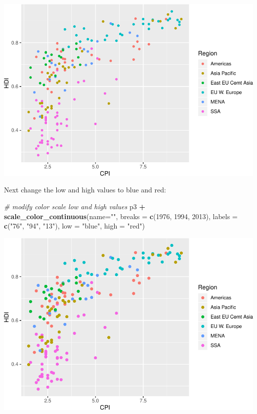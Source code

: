 \documentclass[
]{book}
\newenvironment{Shaded}{\begin{snugshade}}{\end{snugshade}}
\newcommand{\CommentTok}[1]{\textcolor[rgb]{0.56,0.35,0.01}{\textit{#1}}}
\newcommand{\DataTypeTok}[1]{\textcolor[rgb]{0.13,0.29,0.53}{#1}}
\newcommand{\DecValTok}[1]{\textcolor[rgb]{0.00,0.00,0.81}{#1}}
\newcommand{\KeywordTok}[1]{\textcolor[rgb]{0.13,0.29,0.53}{\textbf{#1}}}
\newcommand{\NormalTok}[1]{#1}
\newcommand{\OperatorTok}[1]{\textcolor[rgb]{0.81,0.36,0.00}{\textbf{#1}}}
\newcommand{\StringTok}[1]{\textcolor[rgb]{0.31,0.60,0.02}{#1}}
\begin{document}
\includegraphics{R/Rgraphics/figures/unnamed-chunk-199-1.pdf}

Next change the low and high values to blue and red:

\begin{Shaded}
\begin{Highlighting}[]
\CommentTok{\# modify color scale low and high values}
\NormalTok{p3 }\OperatorTok{+}
\StringTok{  }\KeywordTok{scale\_color\_continuous}\NormalTok{(}\DataTypeTok{name=}\StringTok{""}\NormalTok{,}
                         \DataTypeTok{breaks =} \KeywordTok{c}\NormalTok{(}\DecValTok{1976}\NormalTok{, }\DecValTok{1994}\NormalTok{, }\DecValTok{2013}\NormalTok{),}
                         \DataTypeTok{labels =} \KeywordTok{c}\NormalTok{(}\StringTok{"\textquotesingle{}76"}\NormalTok{, }\StringTok{"\textquotesingle{}94"}\NormalTok{, }\StringTok{"\textquotesingle{}13"}\NormalTok{),}
                         \DataTypeTok{low =} \StringTok{"blue"}\NormalTok{, }\DataTypeTok{high =} \StringTok{"red"}\NormalTok{)}
\end{Highlighting}
\end{Shaded}

\includegraphics{R/Rgraphics/figures/unnamed-chunk-200-1.pdf}
\end{document}
